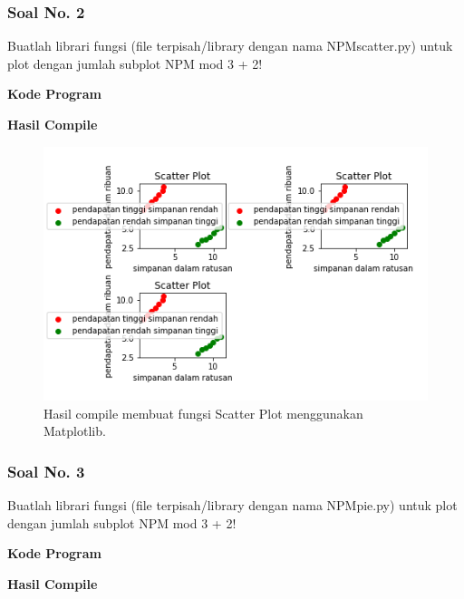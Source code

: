 \subsubsection{Soal No. 2}
\hfill \break
Buatlah librari fungsi (file terpisah/library dengan nama NPMscatter.py) untuk plot dengan jumlah subplot NPM mod 3 + 2!

\hfill \break
\textbf{Kode Program}



\hfill \break
\textbf{Hasil Compile}

\begin{figure}[H]
	\includegraphics[width=12cm]{figures/6/1174034/Teori/p2.png}
	\centering
	\caption{Hasil compile membuat fungsi Scatter Plot menggunakan Matplotlib.}
\end{figure}

\subsubsection{Soal No. 3}
\hfill \break
Buatlah librari fungsi (file terpisah/library dengan nama NPMpie.py) untuk plot dengan jumlah subplot NPM mod 3 + 2!

\hfill \break
\textbf{Kode Program}



\hfill \break
\textbf{Hasil Compile}

